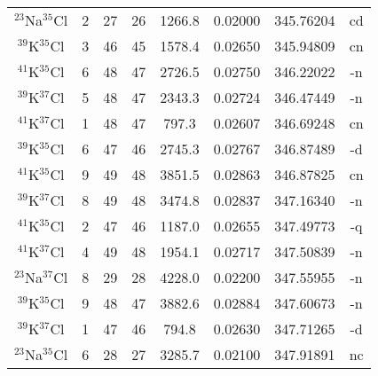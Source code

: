 \begin{table*}[htp]
\begin{tabular}{cccccccc}
$^{23}$Na$^{35}$Cl & 2 & 27 & 26 & 1266.8 & 0.02000 & 345.76204 & cd \\
$^{39}$K$^{35}$Cl & 3 & 46 & 45 & 1578.4 & 0.02650 & 345.94809 & cn \\
$^{41}$K$^{35}$Cl & 6 & 48 & 47 & 2726.5 & 0.02750 & 346.22022 & -n \\
$^{39}$K$^{37}$Cl & 5 & 48 & 47 & 2343.3 & 0.02724 & 346.47449 & -n \\
$^{41}$K$^{37}$Cl & 1 & 48 & 47 & 797.3 & 0.02607 & 346.69248 & cn \\
$^{39}$K$^{35}$Cl & 6 & 47 & 46 & 2745.3 & 0.02767 & 346.87489 & -d \\
$^{41}$K$^{35}$Cl & 9 & 49 & 48 & 3851.5 & 0.02863 & 346.87825 & cn \\
$^{39}$K$^{37}$Cl & 8 & 49 & 48 & 3474.8 & 0.02837 & 347.16340 & -n \\
$^{41}$K$^{35}$Cl & 2 & 47 & 46 & 1187.0 & 0.02655 & 347.49773 & -q \\
$^{41}$K$^{37}$Cl & 4 & 49 & 48 & 1954.1 & 0.02717 & 347.50839 & -n \\
$^{23}$Na$^{37}$Cl & 8 & 29 & 28 & 4228.0 & 0.02200 & 347.55955 & -n \\
$^{39}$K$^{35}$Cl & 9 & 48 & 47 & 3882.6 & 0.02884 & 347.60673 & -n \\
$^{39}$K$^{37}$Cl & 1 & 47 & 46 & 794.8 & 0.02630 & 347.71265 & -d \\
$^{23}$Na$^{35}$Cl & 6 & 28 & 27 & 3285.7 & 0.02100 & 347.91891 & nc \\
\hline
\end{tabular}

\par 
\end{table*}
